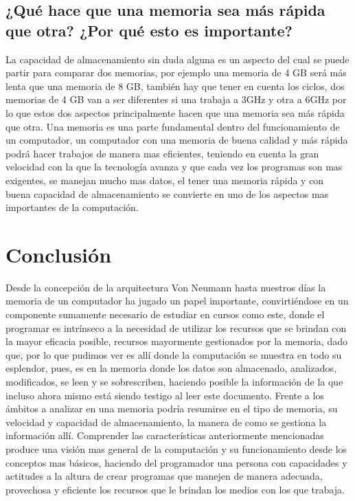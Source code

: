 \documentclass{article}
\begin{document}
    
    
    \subsection{¿Qué hace que una memoria sea más rápida que otra? ¿Por qué esto es importante?}
    La capacidad de almacenamiento sin duda alguna es un aspecto del cual se puede partir para comparar dos memorias, por ejemplo una memoria de 4 GB será más lenta que una memoria de 8 GB, también hay que tener en cuenta los ciclos, dos memorias de 4 GB van a ser diferentes si una trabaja a 3GHz y otra a 6GHz por lo que estos dos aspectos principalmente hacen que una memoria sea más rápida que otra. Una memoria es una parte fundamental dentro del funcionamiento de un computador, un computador con una memoria de buena calidad y más rápida podrá hacer trabajos de manera mas eficientes, teniendo en cuenta la gran velocidad con la que la tecnología avanza y que cada vez los programas son mas exigentes, se manejan mucho mas datos, el tener una memoria rápida y con buena capacidad de almacenamiento se convierte en uno de los aspectos mas importantes de la computación. 


\section{Conclusión} \label{conclulsion}
Desde la concepción de la arquitectura Von Neumann hasta nuestros días la memoria de un computador ha jugado un papel importante, convirtiéndose en un componente sumamente necesario de estudiar en cursos como este, donde el programar es intrínseco a la necesidad de utilizar los recursos que se brindan con la mayor eficacia posible, recursos mayormente gestionados por la memoria, dado que, por lo que pudimos ver es allí donde la computación se muestra en todo su esplendor, pues, es en la memoria donde los datos son almacenado, analizados, modificados, se leen y se sobrescriben, haciendo posible la información de la que incluso ahora mismo está siendo testigo al leer este documento. Frente a los ámbitos a analizar en una memoria podría resumirse en el tipo de memoria, su velocidad y capacidad de almacenamiento, la manera de como se gestiona la información allí. Comprender las características anteriormente mencionadas produce una  visión mas general de la computación y su funcionamiento desde los conceptos mas básicos, haciendo del programador una persona con capacidades y actitudes a la altura de crear programas que manejen de manera adecuada, provechosa y eficiente los recursos que le brindan los medios con los que trabaja.


\end{document}
